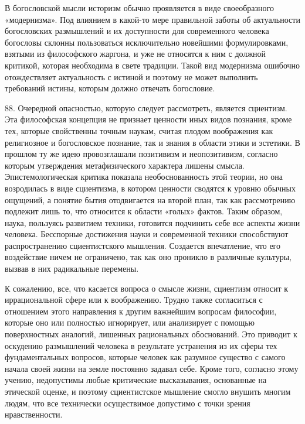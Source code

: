 \documentclass[a5paper,10pt]{article}
\begin{document}
В богословской мысли историзм обычно проявляется в виде своеобразного
«модернизма». Под влиянием в какой-то мере правильной заботы об актуальности
богословских размышлений и их доступности для современного человека богословы
склонны пользоваться исключительно новейшими формулировками, взятыми из
философского жаргона, и уже не относятся к ним с должной критикой, которая
необходима в свете традиции.  Такой вид модернизма ошибочно отождествляет
актуальность с истиной и поэтому не может выполнить требований истины, которым
должно отвечать богословие.

88. Очередной опасностью, которую следует рассмотреть, является сциентизм. Эта
философская концепция не признает ценности иных видов познания, кроме тех,
которые свойственны точным наукам, считая плодом воображения как религиозное и
богословское познание, так и знания в области этики и эстетики. В прошлом ту же
идею провозглашали позитивизм и неопозитивизм, согласно которым утверждения
метафизического характера лишены смысла. Эпистемологическая критика показала
необоснованность этой теории, но она возродилась в виде сциентизма, в котором
ценности сводятся к уровню обычных ощущений, а понятие бытия отодвигается на
второй план, так как рассмотрению подлежит лишь то, что относится к области
«голых» фактов. Таким образом, наука, пользуясь развитием техники, готовится
подчинить себе все аспекты жизни человека. Бесспорные достижения науки и
современной техники способствуют распространению сциентистского мышления.
Создается впечатление, что его воздействие ничем не ограничено, так как оно
проникло в различные культуры, вызвав в них радикальные перемены.

К сожалению, все, что касается вопроса о смысле жизни, сциентизм относит к
иррациональной сфере или к воображению. Трудно также согласиться с отношением
этого направления к другим важнейшим вопросам философии, которые оно или
полностью игнорирует, или анализирует с помощью поверхностных аналогий,
лишенных рациональных обоснований. Это приводит к оскудению размышлений
человека в результате устранения из их сферы тех фундаментальных вопросов,
которые человек как разумное существо с самого начала своей жизни на земле
постоянно задавал себе. Кроме того, согласно этому учению, недопустимы любые
критические высказывания, основанные на этической оценке, и поэтому
сциентистское мышление смогло внушить многим людям, что все технически
осуществимое допустимо с точки зрения нравственности.
\end{document}

